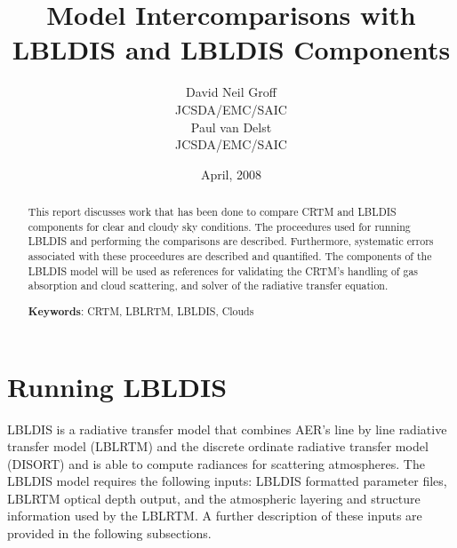 

\newcommand{\microtesla}{\ensuremath{\mu\textrm{T}}}
\newcommand{\degree}{\ensuremath{^\circ}}

\title{Model Intercomparisons with LBLDIS and LBLDIS Components}
\author{David Neil Groff\\JCSDA/EMC/SAIC\\[0.25in]
        Paul van Delst\\JCSDA/EMC/SAIC\\[0.25in]}
\date{April, 2008}



\maketitle

\begin{abstract}
This report discusses work that has been done to compare CRTM and LBLDIS components for clear and cloudy sky conditions. The proceedures used for running LBLDIS and performing the comparisons are described. Furthermore, systematic errors associated with these proceedures are described and quantified.
The components of the LBLDIS model will be used as references for validating the CRTM's handling of gas absorption and cloud scattering, and solver of the radiative transfer equation.   
   

\textbf{Keywords}: CRTM, LBLRTM, LBLDIS, Clouds  
\end{abstract}

\section{Running LBLDIS}
LBLDIS is a radiative transfer model that combines AER's line by line radiative transfer model (LBLRTM) and the discrete ordinate radiative transfer model (DISORT) and is able to compute radiances
for scattering atmospheres. The LBLDIS model requires the following inputs: LBLDIS formatted parameter files, 
LBLRTM optical depth output, and the atmospheric layering and structure information used by the 
LBLRTM. A further description of these inputs are provided in the following subsections.

